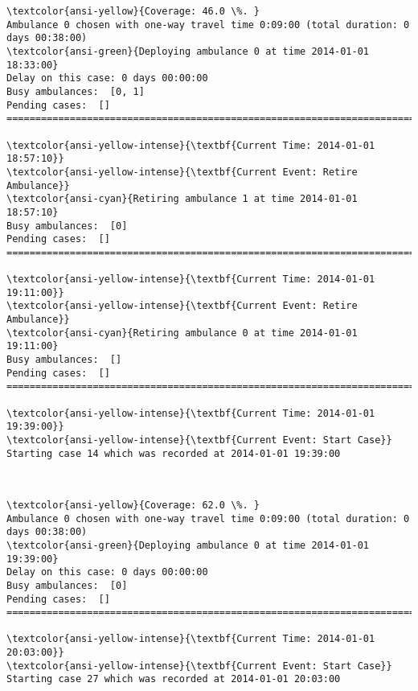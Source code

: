 \documentclass[11pt]{article}
\begin{document}
    \begin{Verbatim}[commandchars=\\\{\}]
\textcolor{ansi-yellow}{Coverage: 46.0 \%. }
Ambulance 0 chosen with one-way travel time 0:09:00 (total duration: 0 days 00:38:00)
\textcolor{ansi-green}{Deploying ambulance 0 at time 2014-01-01 18:33:00}
Delay on this case: 0 days 00:00:00
Busy ambulances:  [0, 1]
Pending cases:  []
========================================================================

\textcolor{ansi-yellow-intense}{\textbf{Current Time: 2014-01-01 18:57:10}}
\textcolor{ansi-yellow-intense}{\textbf{Current Event: Retire Ambulance}}
\textcolor{ansi-cyan}{Retiring ambulance 1 at time 2014-01-01 18:57:10}
Busy ambulances:  [0]
Pending cases:  []
========================================================================

\textcolor{ansi-yellow-intense}{\textbf{Current Time: 2014-01-01 19:11:00}}
\textcolor{ansi-yellow-intense}{\textbf{Current Event: Retire Ambulance}}
\textcolor{ansi-cyan}{Retiring ambulance 0 at time 2014-01-01 19:11:00}
Busy ambulances:  []
Pending cases:  []
========================================================================

\textcolor{ansi-yellow-intense}{\textbf{Current Time: 2014-01-01 19:39:00}}
\textcolor{ansi-yellow-intense}{\textbf{Current Event: Start Case}}
Starting case 14 which was recorded at 2014-01-01 19:39:00

    \end{Verbatim}

    \begin{center}
    \end{center}
    { \hspace*{\fill} \\}
    
    \begin{Verbatim}[commandchars=\\\{\}]
\textcolor{ansi-yellow}{Coverage: 62.0 \%. }
Ambulance 0 chosen with one-way travel time 0:09:00 (total duration: 0 days 00:38:00)
\textcolor{ansi-green}{Deploying ambulance 0 at time 2014-01-01 19:39:00}
Delay on this case: 0 days 00:00:00
Busy ambulances:  [0]
Pending cases:  []
========================================================================

\textcolor{ansi-yellow-intense}{\textbf{Current Time: 2014-01-01 20:03:00}}
\textcolor{ansi-yellow-intense}{\textbf{Current Event: Start Case}}
Starting case 27 which was recorded at 2014-01-01 20:03:00

    \end{Verbatim}
\end{document}
